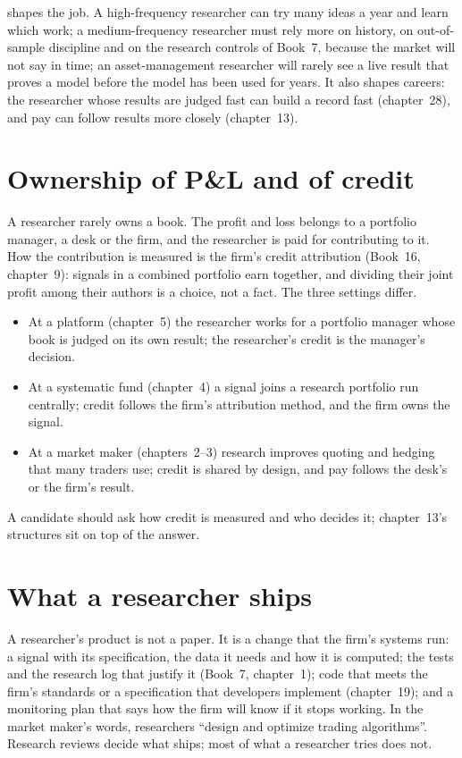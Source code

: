  shapes the job. A high-frequency researcher can try many ideas a year and learn which work; a
medium-frequency researcher must rely more on history, on out-of-sample discipline and on the research controls of Book~7,
because the market will not say in time; an asset-management researcher will rarely see a live result that proves a model
before the model has been used for years. It also shapes careers: the researcher whose results are judged fast can build a
record fast (chapter~28), and pay can follow results more closely (chapter~13).

\section{Ownership of P\&L and of credit}

A researcher rarely owns a book. The profit and loss belongs to a portfolio manager, a desk or the firm, and the
researcher is paid for contributing to it. How the contribution is measured is the firm's credit attribution (Book~16,
chapter~9): signals in a combined portfolio earn together, and dividing their joint profit among their authors is a
choice, not a fact. The three settings differ.
\begin{itemize}
\item At a platform (chapter~5) the researcher works for a portfolio manager whose book is judged on its own result; the
researcher's credit is the manager's decision.
\item At a systematic fund (chapter~4) a signal joins a research portfolio run centrally; credit follows the firm's
attribution method, and the firm owns the signal.
\item At a market maker (chapters~2--3) research improves quoting and hedging that many traders use; credit is shared by
design, and pay follows the desk's or the firm's result.
\end{itemize}
A candidate should ask how credit is measured and who decides it; chapter~13's structures sit on top of the answer.

\section{What a researcher ships}

A researcher's product is not a paper. It is a change that the firm's systems run: a signal with its specification, the
data it needs and how it is computed; the tests and the research log that justify it (Book~7, chapter~1); code that meets
the firm's standards or a specification that developers implement (chapter~19); and a monitoring plan that says how the
firm will know if it stops working. In the market maker's words, researchers ``design and optimize trading algorithms''.
Research reviews decide what ships; most of what a researcher tries does not.

